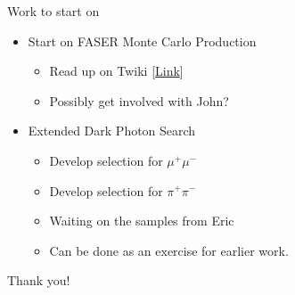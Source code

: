 \begin{frame}{Work to start on}
    \begin{itemize}
        \item Start on FASER Monte Carlo Production 
        \begin{itemize}
            \item Read up on Twiki [\href{https://twiki.cern.ch/twiki/bin/view/FASER/MonteCarloProduction}{Link}]
            \item Possibly get involved with John?
        \end{itemize}
        \item Extended Dark Photon Search
        \begin{itemize}
            \item Develop selection for $\mu^+ \mu^-$
            \item Develop selection for $\pi^+ \pi^-$
            \item Waiting on the samples from Eric
            \item Can be done as an exercise for earlier work. 
        \end{itemize}
    \end{itemize}
\end{frame}

\begin{frame}
    \centering
    \Large Thank you!
\end{frame}